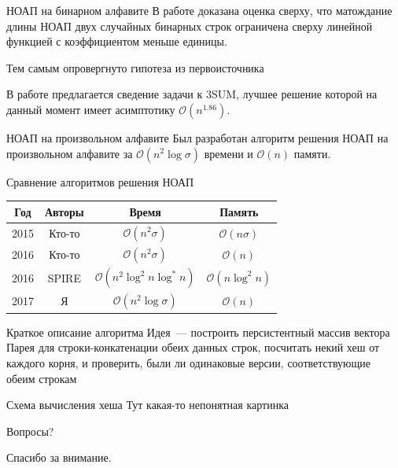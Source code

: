 \documentclass[hyperref=unicode,graphics=pdflatex,12pt]{beamer}
\begin{document}
\begin{frame}{НОАП на бинарном алфавите}
В работе доказана оценка сверху, что матождание длины НОАП двух случайных бинарных строк
ограничена сверху линейной функцией с коэффициентом меньше единицы.

Тем самым опровергнуто гипотеза из первоисточника

\vspace{0.5cm}
В работе предлагается сведение задачи к 3SUM, лучшее решение которой на данный момент имеет
асимптотику $\mathcal{O}(n^{1.86})$.
\end{frame}

\begin{frame}{НОАП на произвольном алфавите}
\hspace{0.5cm}
Был разработан алгоритм решения НОАП на произвольном алфавите
за $\mathcal{O}(n^2 \log \sigma)$ времени и $\mathcal{O}(n)$ памяти.

\vspace{0.5cm}

Сравнение алгоритмов решения НОАП

\begin{center}
\begin{tabular}{|c|c|c|c|}
\hline
Год & Авторы & Время & Память \\
\hline
2015 & Кто-то & $\mathcal{O}(n^2 \sigma)$ & $\mathcal{O}(n \sigma)$ \\
\hline
2016 & Кто-то & $\mathcal{O}(n^2 \sigma)$ & $\mathcal{O}(n)$ \\
\hline
2016 & SPIRE & $\mathcal{O}(n^2 \log^2 n \log^* n)$ & $\mathcal{O}(n \log^2 n)$ \\
\hline
2017 & Я & $\mathcal{O}(n^2 \log \sigma)$ & $\mathcal{O}(n)$ \\
\hline
\end{tabular}
\end{center}
\end{frame}
      
\begin{frame}{Краткое описание алгоритма}
\vspace{0.5cm}
\hspace{0.5cm}
Идея~--- построить персистентный массив вектора Парея для строки-конкатенации обеих данных строк,
посчитать некий хеш от каждого корня, и проверить, были ли одинаковые версии, соответствующие обеим строкам
\end{frame}

\begin{frame}{Схема вычисления хеша}
Тут какая-то непонятная картинка
\end{frame}

\begin{frame}{Вопросы?}
\begin{center}
Спасибо за внимание.
\end{center}
\end{frame}
\end{document}
